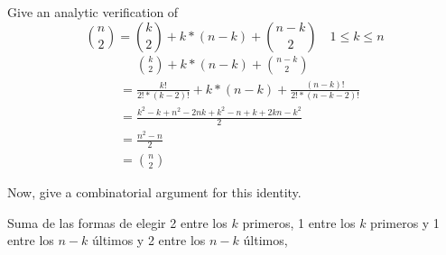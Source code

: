 \item Give an analytic verification of
\[ \binom{n}{2} = \binom{k}{2} + k*(n-k) + \binom{n-k}{2}\quad 1 \le k \le n\]
\begin{align*}
    &\phantom{{}={}} \binom{k}{2} + k*(n-k) + \binom{n-k}{2}\\
    &= \frac{k!}{2!*(k-2)!} + k*(n-k) + \frac{(n-k)!}{2!*(n-k-2)!}\\
    &= \frac{k^2 - k + n^2 - 2nk + k^2 -n + k + 2kn-k^2}{2}\\
    &= \frac{n^2 - n}{2}\\
    &= \binom{n}{2}
\end{align*}

Now, give a combinatorial argument for this identity.

Suma de las formas de elegir 2 entre los $k$ primeros, 1 entre los $k$ primeros y 1 entre los $n-k$ últimos y 2 entre los $n-k$ últimos,